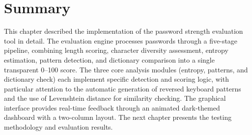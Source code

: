 \section{Summary}

This chapter described the implementation of the password strength evaluation tool in detail. The evaluation engine processes passwords through a five-stage pipeline, combining length scoring, character diversity assessment, entropy estimation, pattern detection, and dictionary comparison into a single transparent 0--100 score. The three core analysis modules (entropy, patterns, and dictionary check) each implement specific detection and scoring logic, with particular attention to the automatic generation of reversed keyboard patterns and the use of Levenshtein distance for similarity checking. The graphical interface provides real-time feedback through an animated dark-themed dashboard with a two-column layout. The next chapter presents the testing methodology and evaluation results.